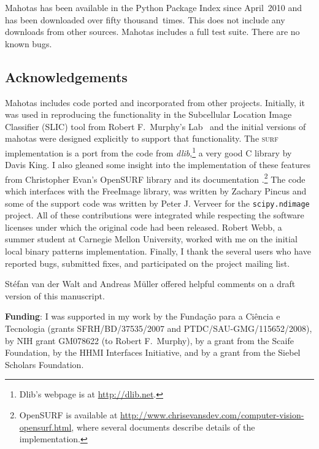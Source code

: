 \documentclass{scrartcl}
\newcommand*{\cpp}{{C\nolinebreak[4]\hspace{-.05em}\raisebox{.4ex}{\tiny\textbf{++}}}}
\let\code\texttt
\begin{document}
Mahotas has been available in the Python Package Index since April~2010 and has
been downloaded over fifty thousand~times. This does not include any downloads
from other sources. Mahotas includes a full test suite. There are no known
bugs.

\subsection*{Acknowledgements}

Mahotas includes code ported and incorporated from other projects. Initially,
it was used in reproducing the functionality in the Subcellular Location Image
Classifier (SLIC) tool from Robert F.\ Murphy's
Lab~\citep{springerlink:10.1007/978-0-387-45524-2_47} and the initial versions
of mahotas were designed explicitly to support that functionality. The
\textsc{surf} implementation is a port from the code from
\textit{dlib},\footnote{Dlib's webpage is at \url{http://dlib.net}.} a very
good \cpp{} library by Davis King. I also gleaned some insight into the
implementation of these features from Christopher Evan's OpenSURF library and
its documentation \citep{evans2009}.\footnote{OpenSURF is available at
\url{http://www.chrisevansdev.com/computer-vision-opensurf.html}, where several
documents describe details of the implementation.} The code which interfaces
with the FreeImage library, was written by Zachary Pincus and some of the
support code was written by Peter J. Verveer for the \code{scipy.ndimage}
project. All of these contributions were integrated while respecting the
software licenses under which the original code had been released. Robert Webb,
a summer student at Carnegie Mellon University, worked with me on the initial
local binary patterns implementation. Finally, I thank the several users who
have reported bugs, submitted fixes, and participated on the project
mailing list.

St\'efan van der Walt and Andreas M\"uller offered helpful comments on a draft
version of this manuscript.

\textbf{Funding}: I was supported in my work by the Funda\c c\~{a}o para a
Ci\^encia e Tecnologia (grants SFRH/BD/37535/2007 and
PTDC/SAU-GMG/115652/2008), by NIH grant GM078622 (to Robert F.\ Murphy), by a
grant from the Scaife Foundation, by the HHMI Interfaces Initiative, and by a
grant from the Siebel Scholars Foundation.


\end{document}
